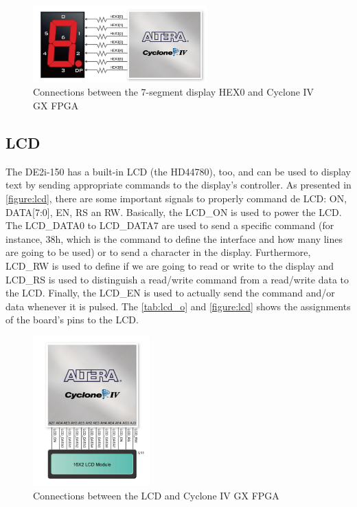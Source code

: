                 \begin{figure}[!ht]
                    \begin{center}
                        \includegraphics[width= 0.6\textwidth]{figures/chap2/hex.png}
                        \caption{\label{figure:hex} Connections between the 7-segment display HEX0 and Cyclone IV GX FPGA}
                    \end{center}
                \end{figure}
        
        \subsection{LCD}
            The DE2i-150 has a built-in LCD (the HD44780), too, and can be used to display text by sending appropriate commands to the display's controller. As presented in \autoref{figure:lcd}, there are some important signals to properly command de LCD: ON, DATA[7:0], EN, RS an RW. Basically, the LCD\_ON is used to power the LCD. The LCD\_DATA0 to LCD\_DATA7 are used to send a specific command (for instance, 38h, which is the command to define the interface and how many lines are going to be used) or to send a character in the display. Furthermore, LCD\_RW is used to define if we are going to read or write to the display and LCD\_RS is used to distinguish a read/write command from a read/write data to the LCD. Finally, the LCD\_EN is used to actually send the command and/or data whenever it is pulsed. The \autoref{tab:lcd_o} and \autoref{figure:lcd} shows the assignments of the board's pins to the LCD.
                
            \begin{figure}[!ht]
                \begin{center}
                    \includegraphics[width= 0.4\textwidth]{figures/chap2/lcd.png}
                    \caption{\label{figure:lcd} Connections between the LCD and Cyclone IV GX FPGA}
                \end{center}
            \end{figure}

